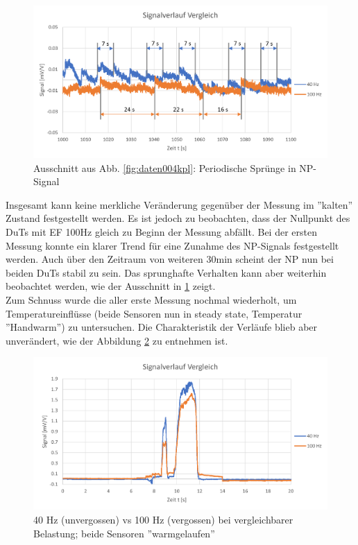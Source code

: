 \begin{figure}[H]
	\centering
	\includegraphics[width=1\linewidth]{imgs/daten_004_detail}
	\caption{Ausschnitt aus Abb. \ref{fig:daten004kpl}: Periodische Sprünge in NP-Signal}
	\label{fig:daten004detail}
\end{figure}\noindent
Insgesamt kann keine merkliche Veränderung gegenüber der Messung im ''kalten'' Zustand festgestellt werden. Es ist jedoch zu beobachten, dass der Nullpunkt des DuTs mit EF 100Hz gleich zu Beginn der Messung abfällt. Bei der ersten Messung konnte ein klarer Trend für eine Zunahme des NP-Signals festgestellt werden. Auch über den Zeitraum von weiteren 30min scheint der NP nun bei beiden DuTs stabil zu sein. Das sprunghafte Verhalten kann aber weiterhin beobachtet werden, wie der Ausschnitt in \ref{fig:daten004detail} zeigt.\\
Zum Schnuss wurde die aller erste Messung nochmal wiederholt, um Temperatureinflüsse (beide Sensoren nun in steady state, Temperatur ''Handwarm'') zu untersuchen. Die Charakteristik der Verläufe blieb aber unverändert, wie der Abbildung \ref{fig:daten006kpl} zu entnehmen ist. 
\begin{figure}[H]
	\centering
	\includegraphics[width=1\linewidth]{imgs/daten_006_kpl}
	\caption{40 Hz (unvergossen) vs 100 Hz (vergossen) bei vergleichbarer Belastung; beide Sensoren ''warmgelaufen''}
	\label{fig:daten006kpl}
\end{figure}\noindent
